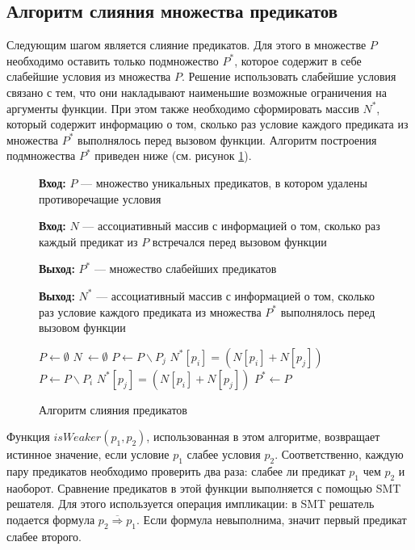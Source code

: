 \subsection{Алгоритм слияния множества предикатов}
Следующим шагом является слияние предикатов. Для этого в множестве $P$ необходимо оставить только подмножество $P^*$, которое содержит в себе слабейшие условия из множества $P$. Решение использовать слабейшие условия связано с тем, что они накладывают наименьшие возможные ограничения на аргументы функции. При этом также необходимо сформировать массив $N^*$, который содержит информацию о том, сколько раз условие каждого предиката из множества $P^*$ выполнялось перед вызовом функции. Алгоритм построения подмножества $P^*$ приведен ниже (см. рисунок \ref{image:megringAlgoritm}).
\begin{figure}[h!]
\textbf{Вход:} $P$ --- множество уникальных предикатов, в котором удалены противоречащие условия

\textbf{Вход:} $N$ --- ассоциативный массив с информацией о том, сколько раз каждый предикат из $P$ встречался перед вызовом функции

\textbf{Выход:} $P^*$ --- множество слабейших предикатов

\textbf{Выход:} $N^*$ --- ассоциативный массив с информацией о том, сколько раз условие каждого предиката из множества $P^*$ выполнялось перед вызовом функции

\begin{algorithmic}[1]
\State $P \leftarrow \emptyset$
\State $N\ \leftarrow \emptyset$
			\State $P \leftarrow P \backslash P_j$
			\State $N^*[p_i] = (N[p_i] + N[p_j])$
		\Else 
				\State $P \leftarrow P \backslash P_i$
				\State $N^*[p_j] = (N[p_i] + N[p_j])$
    			\EndIf
    		\EndIf
    \EndFor
\EndFor
\State $P^* \leftarrow P$
\end{algorithmic}
\caption{Алгоритм слияния предикатов}
\label{image:megringAlgoritm}
\end{figure}
Функция $isWeaker(p_1, p_2)$, использованная в этом алгоритме, возвращает истинное значение, если условие $p_1$ слабее условия $p_2$. Соответственно, каждую пару предикатов необходимо проверить два раза: слабее ли предикат $p_1$ чем $p_2$ и наоборот. Сравнение предикатов в этой функции выполняется с помощью SMT решателя. Для этого исполь­зуется операция импликации: в SMT решатель подается форму­ла $\overline{p_2 \Longrightarrow p_1}$. Если формула невыполнима, значит первый предикат слабее второго.

